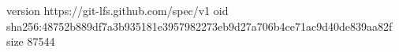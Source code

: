 version https://git-lfs.github.com/spec/v1
oid sha256:48752b889df7a3b935181e3957982273eb9d27a706b4ce71ac9d40de839aa82f
size 87544
